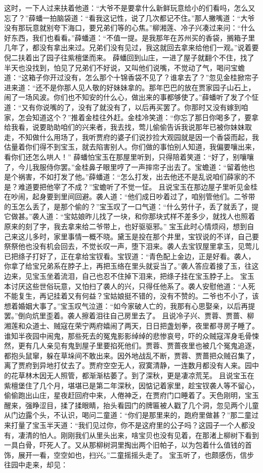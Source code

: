 \documentclass[12pt,oneside]{book}
\begin{document}
这时，一下人过来扶着他道：“大爷不是要拿什么新鲜玩意给小的们看吗，怎么又忘了？”薛蟠一拍脑袋道：“看我这记性，说了几次都记不住。”那人撇嘴道：“大爷没有那玩意就别夸下海口，要兄弟们等的心焦。”柳湘莲、冷子兴凑过来问：“什么好东西，我们也看看。”薛蟠道：“不值一提。是我那年在苏州买的香袋，搁箱子里几年了，都没有拿出来过。兄弟们没有见过，我这就回去拿来给他们一观。”说着要倪二扶着出了园子往紫檀堡而来。
薛蟠回到山庄，一进了屋子就翻个不住，找了半天也没找到，怕见了兄弟们不好说，又叫他们说嘴，不觉动了气，喝问宝蟾道：“这箱子你开过没有，怎么那个十锦香袋不见了？谁拿去了？”忽见金桂掀帘子进来道：“还不是你那人见人敬的好妹妹拿的。那年巴巴的放在贾家园子山石上，闹了一场风波。你们也不知安的什么心，做出来的事都够使了。”薛蟠听了发了个怔道：“又有你说嘴的了，没有了就没有了，以后再买罢了。你那时又没有嫁到咱家，怎会知道这个？”推着金桂往外赶。金桂冷笑道：“你忘了那日你喝多了，要拿给我看，说要助助咱们的兴来者，我去找，莺儿偷偷告诉我说那年已被你妹妹取走，不知做什么用场了，我听贾府的婆子们说抄捡大观园就是因一个香袋而起，我估量着你们得不到宝玉，就去陷害别人。你们做的事怕别人知道，我偏要嚷出来，看你们还怎么哄人！”
薛蟠怕宝玉在那屋里听到，只得陪着笑道：“好了，别嚷嚷了，今儿我服侍你罢。”金桂鼻子眼里哼了一声摔帘子出去了。宝蟾道：“留着他也是个祸害，不如打发了他。”薛蟠道：“怎么打发，出去他还不是乱说咱们薛家的不是？难道要把他宰了不成？”宝蟾听了不觉一怔。
且说宝玉在那边屋子里听见金桂在吵闹，起身要到里间回避。袭人道：“他们成日吵着过了，咱别管他们。二爷带的玉怎么丢了，是那个偷的？”宝玉叹了一口气道：“什么劳什子，丢了就丢了，提它做甚。”袭人道：“宝姑娘昨儿找了一块，和你那块式样不差多少，就找人也照着原来的刻了字，我去拿来给二爷带上，也好驱驱邪。”
宝玉此时心情烦闷，想到自己来这儿多时，家里事情一概不晓。黛玉是投在那个井里，宝钗说的不详，自己要祭祭他也没有机会回去，不觉长叹一声，堕下泪来。袭人去宝钗屋里拿玉，见莺儿已把绦子打好了，正在拿给宝钗看。宝钗道：“青色配上金边，正是好看。袭人，你拿了给宝兄弟系在脖子上，再把玉络在里头就妥当了。”袭人答应着接了玉，往这边来，见宝玉坐着流泪，自己也忍不住掉下泪来，把绦子挂在宝玉脖子上。
宝玉本讨厌这些世俗玩意，又怕扫了袭人的兴，只得任他系了。袭人安慰他道：“人死不能复生，再记挂着又有何益？宝姑娘挺不错的，没有不赞的。二爷也不小了，该想着婚姻大事了。”宝玉叹气泣道：“如今家破人亡的，我那有心思娶亲，以后再提罢。”倒向炕里歪着。袭人擦着泪往自己房里去了。
且说冷子兴、贾蓉、贾蔷、柳湘莲和众道士、贼寇在荣宁两府嬉闹了两天，日日把盏划拳，夜里都寻房子睡了。谁知半夜园中闹鬼，那些死去的冤鬼影影绰绰的悲惨哀号，吓的众贼寇浑身毛骨悚然，更有几人亲见有鬼到屋子里要掐死他们。贾蓉、贾蔷夜里也被几个冤鬼追逐，都抱头鼠窜，躲在草垛间不敢出来。因外地战乱不断，贾蓉、贾蔷把众贼召集了，离了贾府到异地打仗去了。贾府空空无人，寂寞清静，一连数月都没有人来。园中的花草林木因无人照管，都渐渐枯萎了。到了深秋，更是凄凉荒芜。
且说宝玉在紫檀堡住了几个月，堪堪已是第二年深秋，因惦记着家里，趁宝钗袭人等不留心，偷偷跑出山庄，星夜赶回府中来，人倦神乏，在贾府门口睡着了。天色刚明，宝玉醒来，强睁涩目，揉了揉眼睛，抬头看园门的牌匾被人戳了几个洞，忽见两个儿童从门边露个头，不认识，喝问二童道：“你们是那里来的，跑府里做甚？”那二童过来打量了宝玉半天道：“我们见过你，你不是这府里的公子吗？这园子一个人都没有，凄清的怕人。刚刚我们从里头出来，啥宝贝也没有见着，在那渚上柳树下看到一具白骨，吓死人了。又从那柳树洞里掏出两个旧帕子，以为包着什么值钱的首饰，展开一看，空空如也，扫兴。”二童摇摇头走了。
宝玉听了，也颇感伤，信步往园中走来，却见：
\end{document}
